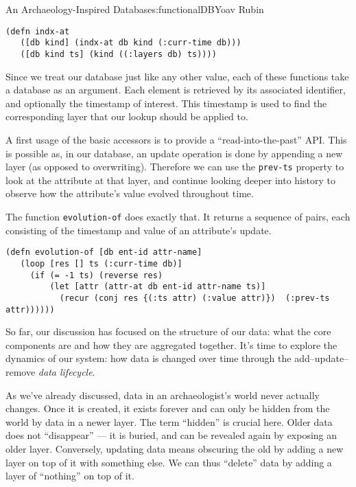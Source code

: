 \begin{aosachapter}{An Archaeology-Inspired Database}{s:functionalDB}{Yoav Rubin}
\begin{verbatim}
(defn indx-at
   ([db kind] (indx-at db kind (:curr-time db)))
   ([db kind ts] (kind ((:layers db) ts))))
\end{verbatim}

Since we treat our database just like any other value, each of these
functions take a database as an argument. Each element is retrieved by
its associated identifier, and optionally the timestamp of interest.
This timestamp is used to find the corresponding layer that our lookup
should be applied to.

\label{evolution}

A first usage of the basic accessors is to provide a
``read-into-the-past'' API. This is possible as, in our database, an
update operation is done by appending a new layer (as opposed to
overwriting). Therefore we can use the \texttt{prev-ts} property to look
at the attribute at that layer, and continue looking deeper into history
to observe how the attribute's value evolved throughout time.

The function \texttt{evolution-of} does exactly that. It returns a
sequence of pairs, each consisting of the timestamp and value of an
attribute's update.

\begin{verbatim}
(defn evolution-of [db ent-id attr-name]
   (loop [res [] ts (:curr-time db)]
     (if (= -1 ts) (reverse res)
         (let [attr (attr-at db ent-id attr-name ts)]
           (recur (conj res {(:ts attr) (:value attr)})  (:prev-ts attr))))))
\end{verbatim}

\label{data-behavior-and-life-cycle}

So far, our discussion has focused on the structure of our data: what
the core components are and how they are aggregated together. It's time
to explore the dynamics of our system: how data is changed over time
through the add--update--remove \emph{data lifecycle}.

As we've already discussed, data in an archaeologist's world never
actually changes. Once it is created, it exists forever and can only be
hidden from the world by data in a newer layer. The term ``hidden'' is
crucial here. Older data does not ``disappear'' --- it is buried, and
can be revealed again by exposing an older layer. Conversely, updating
data means obscuring the old by adding a new layer on top of it with
something else. We can thus ``delete'' data by adding a layer of
``nothing'' on top of it.


\end{aosachapter}
